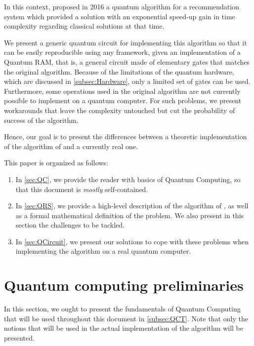 \documentclass[11pt, a4paper]{article}
\begin{document}
        In this context, \citeauthor{QRS} proposed in 2016 a quantum algorithm for a recommendation system which provided a solution with an exponential speed-up gain in time complexity regarding classical solutions at that time.
        
        We present a generic quantum circuit for implementing this algorithm so that it can be easily reproducible using any framework, given an implementation of a Quantum RAM, that is, a general circuit made of elementary gates that matches the original algorithm. Because of the limitations of the quantum hardware, which are discussed in \autoref{subsec:Hardware}, only a limited set of gates can be used. Furthermore, some operations used in the original algorithm are not currently possible to implement on a quantum computer. For such problems, we present workarounds that leave the complexity untouched but cut the probability of success of the algorithm.
        
        Hence, our goal is to present the differences between a theoretic implementation of the algorithm of \citeauthor{QRS} and a currently real one.
        
        This paper is organized as follows:
        
        \begin{enumerate}
         \item In \autoref{sec:QC}, we provide the reader with basics of Quantum Computing, so that this document is \textit{mostly} self-contained.
         \item In \autoref{sec:QRS}, we provide a high-level description of the algorithm of \citeauthor{QRS}, as well as a formal mathematical definition of the problem. We also present in this section the challenges to be tackled.
         \item In \autoref{sec:QCircuit}, we present our solutions to cope with these problems when implementing the algorithm on a real quantum computer.
        \end{enumerate}

    \section{Quantum computing preliminaries}
        \label{sec:QC}
        In this section, we ought to present the fundamentals of Quantum Computing that will be used throughout this document in \autoref{subsec:QCT}. Note that only the notions that will be used in the actual implementation of the algorithm will be presented.
        
\end{document}
